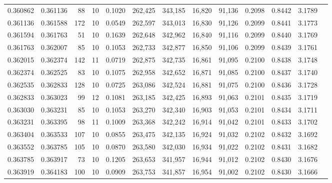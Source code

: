 \begin{tabular}{rrrrrrrrrrrrr}
0.360862 & 0.361136 &    88 &  10 &                                     0.1020 & 262,425 & 343,185 &  16,820 &  91,136 & 0.2098 & 0.8442 & 3.1789 \\
0.361136 & 0.361588 &   172 &  10 &                                     0.0549 & 262,597 & 343,013 &  16,830 &  91,126 & 0.2099 & 0.8441 & 3.1773 \\
0.361594 & 0.361763 &    51 &  10 &                                     0.1639 & 262,648 & 342,962 &  16,840 &  91,116 & 0.2099 & 0.8440 & 3.1769 \\
0.361763 & 0.362007 &    85 &  10 &                                     0.1053 & 262,733 & 342,877 &  16,850 &  91,106 & 0.2099 & 0.8439 & 3.1761 \\
0.362015 & 0.362374 &   142 &  11 &                                     0.0719 & 262,875 & 342,735 &  16,861 &  91,095 & 0.2100 & 0.8438 & 3.1748 \\
0.362374 & 0.362525 &    83 &  10 &                                     0.1075 & 262,958 & 342,652 &  16,871 &  91,085 & 0.2100 & 0.8437 & 3.1740 \\
0.362535 & 0.362833 &   128 &  10 &                                     0.0725 & 263,086 & 342,524 &  16,881 &  91,075 & 0.2100 & 0.8436 & 3.1728 \\
0.362833 & 0.363023 &    99 &  12 &                                     0.1081 & 263,185 & 342,425 &  16,893 &  91,063 & 0.2101 & 0.8435 & 3.1719 \\
0.363030 & 0.363231 &    85 &  10 &                                     0.1053 & 263,270 & 342,340 &  16,903 &  91,053 & 0.2101 & 0.8434 & 3.1711 \\
0.363231 & 0.363395 &    98 &  11 &                                     0.1009 & 263,368 & 342,242 &  16,914 &  91,042 & 0.2101 & 0.8433 & 3.1702 \\
0.363404 & 0.363533 &   107 &  10 &                                     0.0855 & 263,475 & 342,135 &  16,924 &  91,032 & 0.2102 & 0.8432 & 3.1692 \\
0.363552 & 0.363785 &   105 &  10 &                                     0.0870 & 263,580 & 342,030 &  16,934 &  91,022 & 0.2102 & 0.8431 & 3.1682 \\
0.363785 & 0.363917 &    73 &  10 &                                     0.1205 & 263,653 & 341,957 &  16,944 &  91,012 & 0.2102 & 0.8430 & 3.1676 \\
0.363919 & 0.364183 &   100 &  10 &                                     0.0909 & 263,753 & 341,857 &  16,954 &  91,002 & 0.2102 & 0.8430 & 3.1666 \\

\end{tabular}
